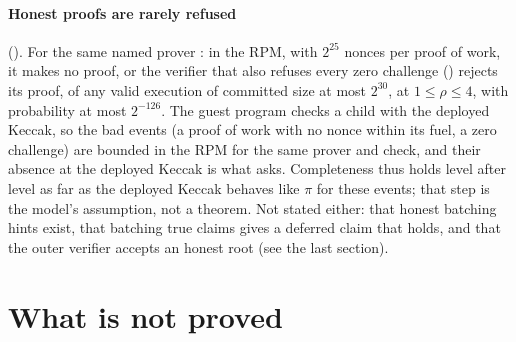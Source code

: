 \documentclass[11pt]{article}
\begin{document}
\paragraph{Honest proofs are rarely refused} (). For the same named
prover : in the RPM, with $2^{25}$ nonces per proof of work, it
makes no proof, or the verifier that also refuses every zero challenge ()
rejects its proof, of any valid execution of committed size at most $2^{30}$, at $1 \le \rho \le 4$,
with probability at most $2^{-126}$. The guest program checks a child with the deployed Keccak, so
the bad events (a proof of work with no nonce within its fuel, a zero challenge) are bounded in the
RPM for the same prover and check, and their absence at the deployed Keccak is what
 asks. Completeness thus holds level after level as far as the deployed Keccak
behaves like $\pi$ for these events; that step is the model's assumption, not a theorem. Not stated
either: that honest batching hints exist, that batching true claims gives a deferred claim that
holds, and that the outer verifier accepts an honest root (see the last section).

\section{What is not proved}
\end{document}
